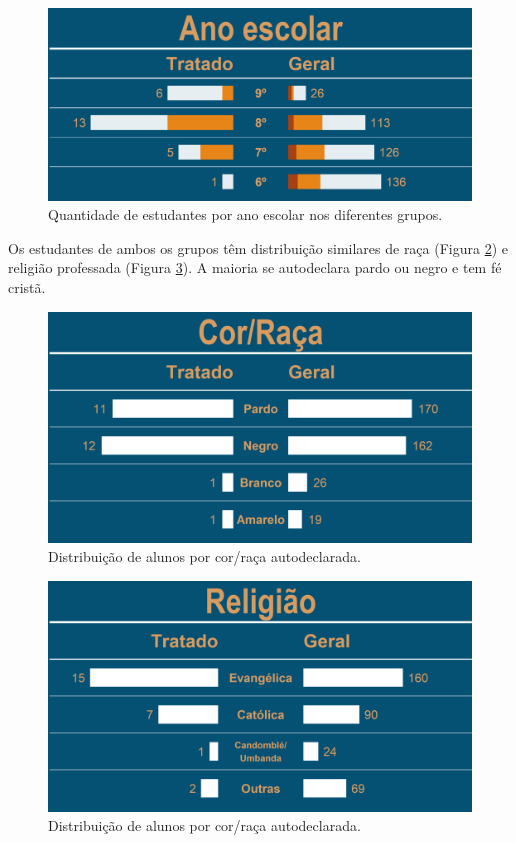 \documentclass[
]{book}
\begin{document}
\begin{figure}

{\centering \includegraphics[width=0.75\linewidth,height=0.75\textheight]{images/Impactos/05} 

}

\caption{Quantidade de estudantes por ano escolar nos diferentes grupos.}\label{fig:impacto05}
\end{figure}

Os estudantes de ambos os grupos têm distribuição similares de raça (Figura \ref{fig:impacto06}) e religião professada (Figura \ref{fig:impacto07}). A maioria se autodeclara pardo ou negro e tem fé cristã.

\begin{figure}

{\centering \includegraphics[width=0.75\linewidth,height=0.75\textheight]{images/Impactos/06} 

}

\caption{Distribuição de alunos por cor/raça autodeclarada.}\label{fig:impacto06}
\end{figure}

\begin{figure}

{\centering \includegraphics[width=0.75\linewidth,height=0.75\textheight]{images/Impactos/07} 

}

\caption{Distribuição de alunos por cor/raça autodeclarada.}\label{fig:impacto07}
\end{figure}
\end{document}
